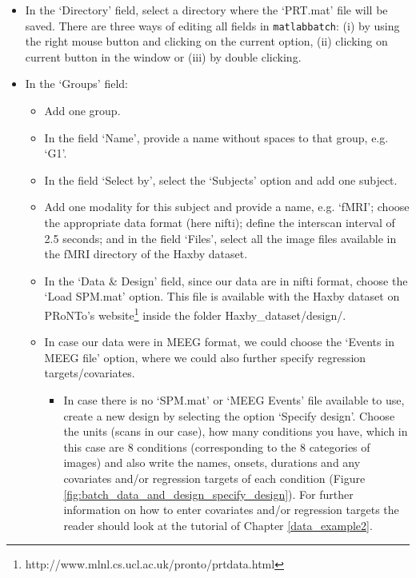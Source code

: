 \begin{itemize}
	\item In the `Directory' field, select a directory where the `PRT.mat' file will be saved. There are three ways of editing all fields in {\tt matlabbatch}: (i) by using the right mouse button and clicking on the current option, (ii) clicking on current button in the window or (iii) by double clicking.
	
	\item In the `Groups' field:
 	
		\begin{itemize}
		
		\item Add one group.
		
		\item In the field `Name', provide a name without spaces to that group, e.g. `G1'. 
		
		\item In the field `Select by', select the `Subjects' option and add one subject.
		
		\item Add one modality for this subject and provide a name, e.g. `fMRI'; choose the appropriate data format (here nifti); define the interscan interval of 2.5 seconds; and in the field `Files', select all the image files available in the fMRI directory of the Haxby dataset.	
		
		\item In the `Data \& Design' field, since our data are in nifti format, choose the `Load SPM.mat' option. This file is available with the Haxby dataset on PRoNTo's website\footnote{http://www.mlnl.cs.ucl.ac.uk/pronto/prtdata.html} inside the folder Haxby\_dataset/design/.

        \item In case our data were in MEEG format, we could choose the `Events in MEEG file' option, where we could also further specify regression targets/covariates.
		
				
		
		\begin{itemize}
	
			\item In case there is no `SPM.mat' or `MEEG Events' file available to use, create a new design by selecting the option `Specify design'. Choose the units (scans in our case), how many conditions you have, which in this case are 8 conditions (corresponding to the 8 categories of images) and also write the names, onsets, durations and any covariates and/or regression targets of each condition (Figure \ref{fig:batch_data_and_design_specify_design}). For further information on how to enter covariates and/or regression targets the reader should look at the tutorial of Chapter \ref{data_example2}.
	

\end{itemize}
\end{itemize}
\end{itemize}

